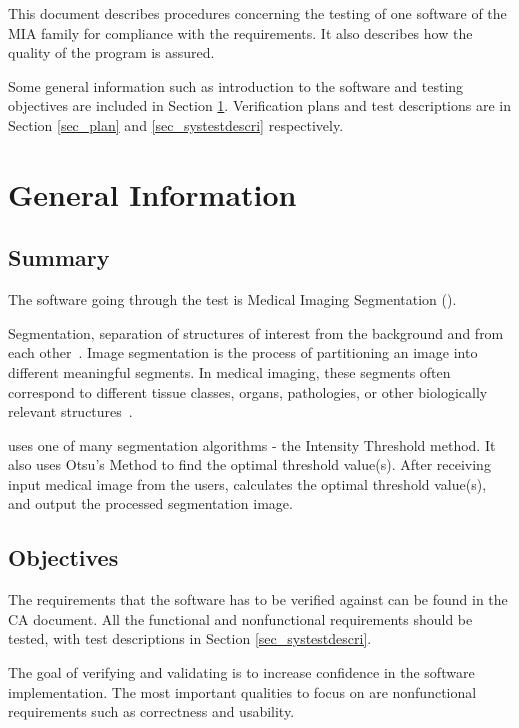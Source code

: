 \documentclass[12pt, titlepage]{article}
\begin{document}
\newpage


This document describes procedures concerning the testing of one software of the MIA family for compliance with the requirements. It also describes how the quality of the program is assured.

Some general information such as introduction to the software and testing objectives are included in Section \ref{sec_geinfo}. Verification plans and test descriptions are in Section \ref{sec_plan} and \ref{sec_systestdescri} respectively.

\section{General Information}
\label{sec_geinfo}

\subsection{Summary}

The software going through the test is Medical Imaging Segmentation (\progname{}).

Segmentation, separation of structures of interest from the background and from each other~\cite{Bankman2000}. Image segmentation is the process of partitioning an image into different meaningful segments. In medical imaging, these segments often correspond to different tissue classes, organs, pathologies, or other biologically relevant structures~\cite{Forouzanfar2010}.

\progname{} uses one of many segmentation algorithms - the Intensity Threshold method. It also uses Otsu's Method to find the optimal threshold value(s). After receiving input medical image from the users, \progname{} calculates the optimal threshold value(s), and output the processed segmentation image.

\subsection{Objectives}

The requirements that the software has to be verified against can be found in the CA document. All the functional and nonfunctional requirements should be tested, with test descriptions in Section \ref{sec_systestdescri}.

The goal of verifying and validating is to increase confidence in the software implementation. The most important qualities to focus on are nonfunctional requirements such as correctness and usability.
\end{document}
